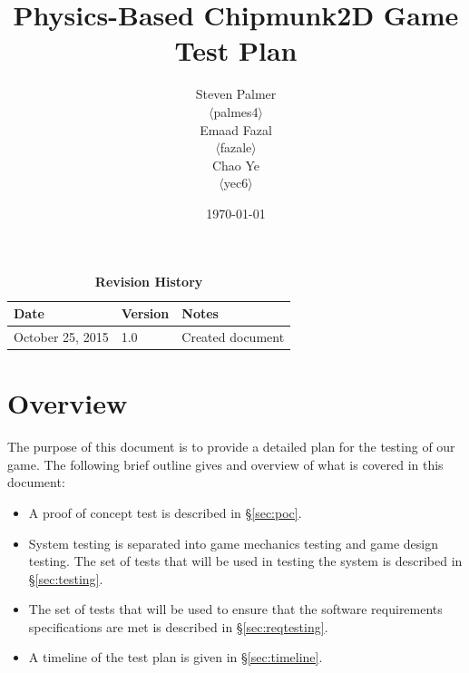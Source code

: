 \documentclass[12pt, titlepage]{article}
\begin{document}
\title{\bf Physics-Based Chipmunk2D Game\\[\baselineskip]\Large Test Plan}
\author{Steven Palmer\\$\langle$palmes4$\rangle$\\Emaad Fazal\\$\langle$fazale$\rangle$\\Chao Ye\\$\langle$yec6$\rangle$}
\date{\today}
	
\maketitle

\tableofcontents


\begin{table}[bp]
\caption*{\bf Revision History}
\begin{tabularx}{\textwidth}{p{3.5cm}p{2cm}X}
\toprule {\bf Date} & {\bf Version} & {\bf Notes}\\
\midrule
October 25, 2015 & 1.0 & Created document\\
\bottomrule
\end{tabularx}
\end{table}

\newpage


\section{Overview}
The purpose of this document is to provide a detailed plan for the testing of our game.  The following brief outline gives and overview of what is covered in this document:

\begin{itemize}
  \item A proof of concept test is described in \hyperref[sec:poc]{\S\ref*{sec:poc}}.
  \item System testing is separated into game mechanics testing and game design testing.  The set of tests that will be used in testing the system is described in \hyperref[sec:testing]{\S\ref*{sec:testing}}.
  \item The set of tests that will be used to ensure that the software requirements specifications are met is described in \hyperref[sec:reqtesting]{\S\ref*{sec:reqtesting}}.
  \item A timeline of the test plan is given in \hyperref[sec:timeline]{\S\ref*{sec:timeline}}.  
\end{itemize}
\end{document}
